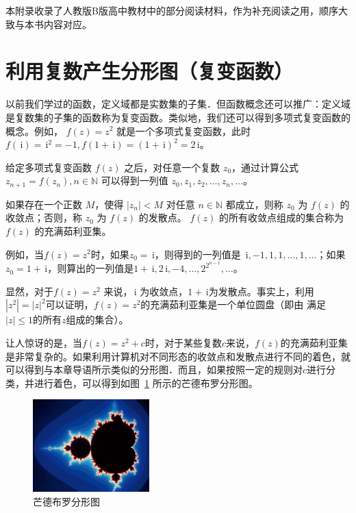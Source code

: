 \documentclass[a4paper,openany]{ctexbook}
\newcommand{\ii}{\,\mathrm{i}}
\begin{document}
本附录收录了人教版B版高中教材中的部分阅读材料，作为补充阅读之用，顺序大致与本书内容对应。

\section{利用复数产生分形图（复变函数）}

以前我们学过的函数，定义域都是实数集的子集．但函数概念还可以推广：定义域是复数集的子集的函数称为复变函数。类似地，我们还可以得到多项式复变函数的概念。例如，%
\(f(z)=z^2\) 就是一个多项式复变函数，此时 \(f(\ii)=\ii^2=-1,f(1+\ii)=(1+\ii)^2=2\ii\)。

给定多项式复变函数 \(f(z)\) 之后，对任意一个复数 \(z_0\)，通过计算公式 \(z_{n+1}=f(z_n),n\in \mathbb{N}\) 可以得到一列值 \(z_0,z_1,z_2,\dots,z_n,\dots\)。

如果存在一个正数 \(M\)，使得 \(|z_n|<M\) 对任意 \(n\in \mathbb{N}\) 都成立，则称 \(z_0\) 为 \(f(z)\) 的收敛点；否则，称 \(z_0\) 为 \(f(z)\) 的发散点。%
\(f(z)\) 的所有收敛点组成的集合称为 \(f(z)\) 的充满茹利亚集。

例如，当\(f(z)=z^2\)时，如果\(z_0=\ii\)，则得到的一列值是 \(\ii,-1,1,1,\dots,1,\dots\)；如果 \(z_0=1+\ii\)，则算出的一列值是\(1+\ii,2\ii,-4,\dots,2^{2^{n-1}},\dots\)。

显然，对于\(f(z)=z^2\) 来说，\(\ii\) 为收敛点，\(1+\ii\)为发散点。事实上，利用\(|z^2|=|z|^2\)可以证明，\(f(z)=z^2\)的充满茹利亚集是一个单位圆盘（即由
满足\(|z|\le 1\)的所有\(z\)组成的集合）。

让人惊讶的是，当\(f(z)=z^2+c\)时，对于某些复数\(c\)来说，\(f(z)\)的充满茹利亚集是非常复杂的。如果利用计算机对不同形态的收敛点和发散点进行不同的着色，就
可以得到与本章导语所示类似的分形图．而且，如果按照一定的规则对\(c\)进行分类，并进行着色，可以得到如图~\ref{fgr:mhdebuloffxktu} 所示的芒德布罗分形图。

\begin{figure}
    \centering
    \includegraphics[width=0.4\textwidth]{image6.png}
    \caption{芒德布罗分形图}\label{fgr:mhdebuloffxktu}
\end{figure}
\end{document}

